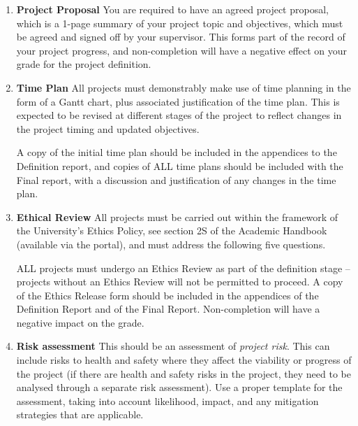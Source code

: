 \begin{enumerate}
    \item \textbf{Project Proposal}
    \subitem You are required to have an agreed project proposal, which is a 1-page summary of your project topic and objectives, which must be agreed and signed off by your supervisor. This forms part of the record of your project progress, and non-completion will have a negative effect on your grade for the project definition.

    \item \textbf{Time Plan}
    \subitem  All projects must demonstrably make use of time planning in the form of a Gantt chart, plus associated justification of the time plan. This is expected to be revised at different stages of the project to reflect changes in the project timing and updated objectives.

    A copy of the initial time plan should be included in the appendices to the Definition report, and copies of ALL time plans should be included with the Final report, with a discussion and justification of any changes in the time plan.

    \item \textbf{Ethical Review}
    \subitem All projects must be carried out within the framework of the University’s Ethics Policy, see section 2S of the Academic Handbook (available via the portal), and must address the following five questions.

    ALL projects must undergo an Ethics Review as part of the definition stage – projects without an Ethics Review will not be permitted to proceed. A copy of the Ethics Release form should be included in the appendices of the Definition Report and of the Final Report. Non-completion will have a negative impact on the grade.

    \item \textbf{Risk assessment}
    \subitem This should be an assessment of \textit{project risk}. This can include risks to health and safety where they affect the viability or progress of the project (if there are health and safety risks in the project, they need to be analysed through a separate risk assessment). Use a proper template for the assessment, taking into account likelihood, impact, and any mitigation strategies that are applicable. 
    

\end{enumerate}
